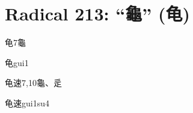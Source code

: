 
\section*{Radical 213: ``⿔'' (龟)}

\begin{entry}{龟}{7}{⿔}
  \begin{phonetics}{龟}{gui1}
  \end{phonetics}
\end{entry}

\begin{entry}{龟速}{7,10}{⿔、⾡}
  \begin{phonetics}{龟速}{gui1su4}
  \end{phonetics}
\end{entry}



